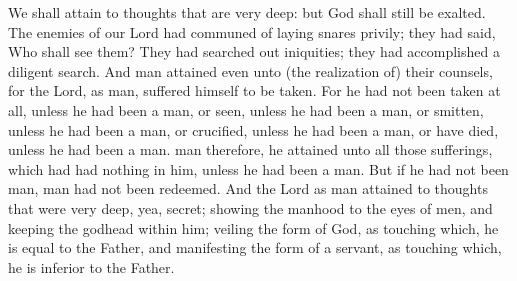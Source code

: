 
{\noindent We shall attain to thoughts that are very deep: but God shall still be exalted. The enemies of our Lord had communed of laying snares privily; they had said, Who shall see them? They had searched out iniquities; they had accomplished a diligent search. And man attained even unto (the realization of) their counsels, for the Lord, as man, suffered himself to be taken. For he had not been taken at all, unless he had been a man, or seen, unless he had been a man, or smitten, unless he had been a man, or crucified, unless he had been a man, or have died, unless he had been a man. man therefore, he attained unto all those sufferings, which had had nothing in him, unless he had been a man. But if he had not been man, man had not been redeemed. And the Lord as man attained to thoughts that were very deep, yea, secret; showing the manhood to the eyes of men, and keeping the godhead within him; veiling the form of God, as touching which, he is equal to the Father, and manifesting the form of a servant, as touching which, he is inferior to the Father.}